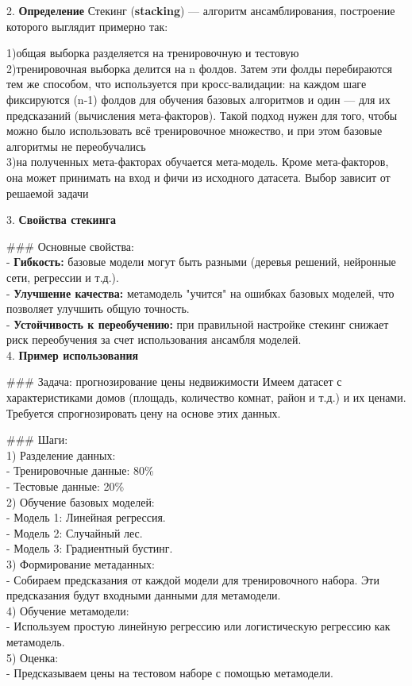 2. \textbf{Определение}  
Стекинг (\textbf{stacking}) — алгоритм ансамблирования, построение которого выглядит примерно так:

1)общая выборка разделяется на тренировочную и тестовую\\
2)тренировочная выборка делится на n фолдов. Затем эти фолды перебираются тем же способом, что используется при кросс-валидации: на каждом шаге фиксируются (n-1)  фолдов для обучения базовых алгоритмов и один — для их предсказаний (вычисления мета-факторов). Такой подход нужен для того, чтобы можно было использовать всё тренировочное множество, и при этом базовые алгоритмы не переобучались\\
3)на полученных мета-факторах обучается мета-модель. Кроме мета-факторов, она может принимать на вход и фичи из исходного датасета. Выбор зависит от решаемой задачи


3. \textbf{Свойства стекинга} 

### Основные свойства:  \\
- \textbf{Гибкость:} базовые модели могут быть разными (деревья решений, нейронные сети, регрессии и т.д.). \\ 
- \textbf{Улучшение качества:} метамодель "учится" на ошибках базовых моделей, что позволяет улучшить общую точность.  \\
- \textbf{Устойчивость к переобучению:} при правильной настройке стекинг снижает риск переобучения за счет использования ансамбля моделей.  \\


4. \textbf{Пример использования}

### Задача: прогнозирование цены недвижимости  
Имеем датасет с характеристиками домов (площадь, количество комнат, район и т.д.) и их ценами. Требуется спрогнозировать цену на основе этих данных.  

### Шаги:  \\
1) Разделение данных:  \\
   - Тренировочные данные: 80\%  \\
   - Тестовые данные: 20\% \\
2) Обучение базовых моделей:\\
   - Модель 1: Линейная регрессия.  \\
   - Модель 2: Случайный лес.  \\
   - Модель 3: Градиентный бустинг.  \\
3) Формирование метаданных:\\ 
   - Собираем предсказания от каждой модели для тренировочного набора. Эти предсказания будут входными данными для метамодели.  \\
4) Обучение метамодели: \\
   - Используем простую линейную регрессию или логистическую регрессию как метамодель.  \\
5) Оценка:\\
   - Предсказываем цены на тестовом наборе с помощью метамодели.  \\

